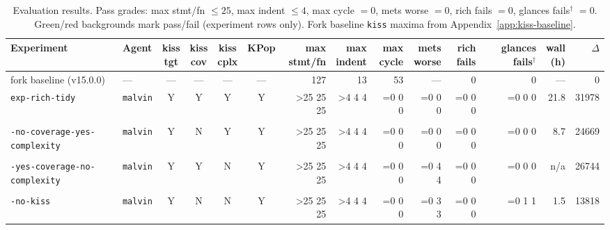 \documentclass[11pt]{article}
\newcommand{\outcellle}[2]{%
  \ifnum#1>#2\relax
    \cellcolor{failbg}#1%
  \else
    \cellcolor{passbg}#1%
  \fi}
\newcommand{\outcelleq}[2]{%
  \ifnum#1=#2\relax
    \cellcolor{passbg}#1%
  \else
    \cellcolor{failbg}#1%
  \fi}
\newcommand{\missdata}{---}
\newcommand{\na}{n/a}
\newcommand{\yes}{Y}
\newcommand{\no}{N}
\newcommand{\exptidy}[1]{\makecell[l]{\texttt{exp-rich-tidy}\\[1pt]\hspace{0.75em}\texttt{#1}}}
\begin{document}
\begin{table}[ht]
  \begin{threeparttable}
  \centering
  \caption{Evaluation results. Pass grades: max stmt/fn $\leq 25$, max indent $\leq 4$, max cycle $= 0$, mets worse $= 0$, rich fails $= 0$, glances fails$^\dagger$ $= 0$. Green/red backgrounds mark pass/fail (experiment rows only). Fork baseline \texttt{kiss} maxima from Appendix~\ref{app:kiss-baseline}.}
  \label{tab:results}
  \scriptsize
  \setlength{\tabcolsep}{3pt}
  \begin{tabular}{@{}l l c c c c | r r r r r r r r@{}}
    \toprule
    Experiment &
    Agent &
    \makecell{kiss\\tgt} &
    \makecell{kiss\\cov} &
    \makecell{kiss\\cplx} &
    KPop &
    \makecell{max\\stmt/fn} &
    \makecell{max\\indent} &
    \makecell{max\\cycle} &
    \makecell{mets\\worse} &
    \makecell{rich\\fails} &
    \makecell{glances\\fails$^\dagger$} &
    \makecell{wall\\(h)} &
    $\Delta$ \\
    \midrule
    fork baseline (v15.0.0) &
    \missdata & \missdata & \missdata & \missdata & \missdata &
    127 & 13 & 53 & \missdata & 0 & 0 & \missdata & 0 \\
    \texttt{exp-rich-tidy} &
    \texttt{malvin} & \yes & \yes & \yes & \yes &
    \outcellle{25}{25} & \outcellle{4}{4} & \outcelleq{0}{0} & \outcelleq{0}{0} & \outcelleq{0}{0} & \outcelleq{0}{0} & 21.8 & 31978 \\
    \exptidy{-no-coverage-yes-complexity} &
    \texttt{malvin} & \yes & \no & \yes & \yes &
    \outcellle{25}{25} & \outcellle{4}{4} & \outcelleq{0}{0} & \outcelleq{0}{0} & \outcelleq{0}{0} & \outcelleq{0}{0} & 8.7 & 24669 \\
    \exptidy{-yes-coverage-no-complexity} &
    \texttt{malvin} & \yes & \yes & \no & \yes &
    \outcellle{25}{25} & \outcellle{4}{4} & \outcelleq{0}{0} & \outcelleq{4}{0} & \outcelleq{0}{0} & \outcelleq{0}{0} & \na & 26744 \\
    \exptidy{-no-kiss} &
    \texttt{malvin} & \yes & \no & \no & \yes &
    \outcellle{25}{25} & \outcellle{4}{4} & \outcelleq{0}{0} & \outcelleq{3}{0} & \outcelleq{0}{0} & \outcelleq{1}{0} & 1.5 & 13818 \\

\end{tabular}
\end{threeparttable}
\end{table}
\end{document}
